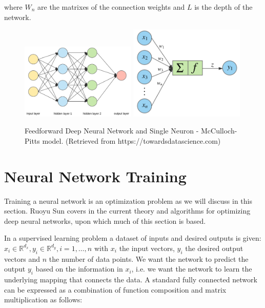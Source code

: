 where $W_n$ are the matrixes of the connection weights and $L$ is the depth of the network. 





   \begin{figure}[b]
	\centering
	\includegraphics[width=0.49\textwidth]{network}
	\includegraphics[width=0.49\textwidth]{neuron}
	\caption{Feedforward Deep Neural Network and Single Neuron - McCulloch-Pitts model. (Retrieved from https://towardsdatascience.com)}
	\label{neural}
	\end{figure}

\newpage

\section{Neural Network Training}
Training a neural network is an optimization problem as we will discuss in this section. Ruoyu Sun covers in \cite{sun2019optimization} the current theory and algorithms for optimizing deep neural networks, upon which much of this section is based.

In a supervised learning problem a dataset of inputs and desired outputs is given: $x_i \in \mathbb{R}^{d_x}, y_i \in \mathbb{R}^{d_y}, i = 1,\dots,n$ with $x_i$ the input vectors, $y_i$ the desired output vectors and $n$ the number of data points. We want the network to predict the output $y_i$ based on the information in $x_i$, i.e. we want the network to learn the underlying mapping that connects the data. A standard fully connected network can be expressed as a combination of function composition and matrix multiplication as follows:


